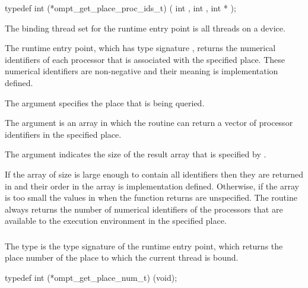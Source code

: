 \format
\begin{ccppspecific}
\begin{omptInquiry}
typedef int (*ompt_get_place_proc_ids_t) (
  int ,
  int ,
  int *
);
\end{omptInquiry}
\end{ccppspecific}

\binding
The binding thread set for the  runtime 
entry point is all threads on a device.

\descr
The  runtime entry point, which has type 
signature , returns the numerical 
identifiers of each processor that is associated with the specified 
place. These numerical identifiers are non-negative and their meaning 
is implementation defined.

\argdesc
The  argument specifies the place that is being queried.

The  argument is an array in which the routine can return
a vector of processor identifiers in the specified place.

The  argument indicates the size of the result array that
is specified by .

\effect
If the  array of size  is large enough to contain 
all identifiers then they are returned in  and their order in the 
array is implementation defined. Otherwise, if the  array is too 
small the values in  when the function returns are unspecified.
The routine always returns the number of numerical identifiers of the 
processors that are available to the execution environment in the specified place.



\subsubsection{}
\label{sec:ompt_get_place_num_t}
\label{sec:ompt_get_place_num}

\summary
The  type is the type signature of the 
 runtime entry point, which returns the
place number of the place to which the current thread is bound.

\format
\begin{ccppspecific}
\begin{omptInquiry}
typedef int (*ompt_get_place_num_t) (void);
\end{omptInquiry}
\end{ccppspecific}

